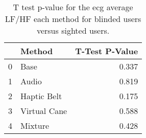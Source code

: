 
\begin{table}[!htb]
\centering
\caption{T test p-value for the ecg average LF/HF each method for blinded users versus sighted users.}
\label{tab:ttest_ecg_lfhf}
\begin{tabular}{llr}
\toprule
{} &        Method &  T-Test P-Value \\
\midrule
0 &          Base &           0.337 \\
1 &         Audio &           0.819 \\
2 &   Haptic Belt &           0.175 \\
3 &  Virtual Cane &           0.588 \\
4 &       Mixture &           0.428 \\
\bottomrule
\end{tabular}
\end{table}

